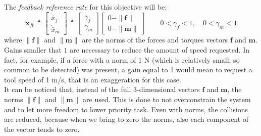 \noindent The \textit{feedback reference rate} for this objective will be:
\begin{equation}
	\label{eq:refForceTask}
	\boldsymbol{\dot{\bar{x}}}_{ft} \triangleq \begin{bmatrix}{\dot{\bar{x}}}_f \\ {\dot{\bar{x}}}_m \end{bmatrix} \triangleq 
	\begin{bmatrix} \gamma_f \\ \gamma_m \end{bmatrix} 
	\begin{bmatrix}
		0 - \| \boldsymbol{f} \| \\ 0 -\| \boldsymbol{m} \|
	\end{bmatrix} \qquad 0 < \gamma_f < 1, \quad 0 < \gamma_m < 1
\end{equation}
where $\| \boldsymbol{f} \|$ and $\| \boldsymbol{m} \|$ are the norms of the forces and torques vectors $\boldsymbol{f}$ and $\boldsymbol{m}$. Gains smaller that $1$ are necessary to reduce the amount of speed requested. In fact, for example, if a force with a norm of 1 N (which is relatively small, so common to be detected) was present, a gain equal to 1 would mean to request a tool speed of 1 m/s, that is an exaggeration for this case.\\
It can be noticed that, instead of the full 3-dimensional vectors $\boldsymbol{f}$ and $\boldsymbol{m}$, the norms $\| \boldsymbol{f} \|$ and $\| \boldsymbol{m\textbf{}} \|$ are used. This is done to not overconstrain the system and to let more freedom to lower priority task. Even with norms, the collisions are reduced, because when we bring to zero the norms, also each component of the vector tends to zero.\\

